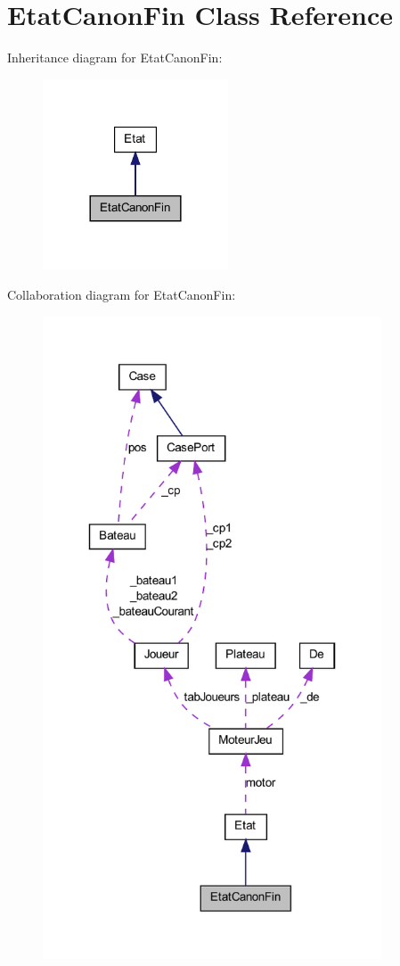 \hypertarget{class_etat_canon_fin}{
\section{EtatCanonFin Class Reference}
\label{class_etat_canon_fin}
}


Inheritance diagram for EtatCanonFin:
\nopagebreak
\begin{figure}[H]
\begin{center}
\leavevmode
\includegraphics[width=156pt]{class_etat_canon_fin__inherit__graph}
\end{center}
\end{figure}


Collaboration diagram for EtatCanonFin:
\nopagebreak
\begin{figure}[H]
\begin{center}
\leavevmode
\includegraphics[width=285pt]{class_etat_canon_fin__coll__graph}
\end{center}
\end{figure}
